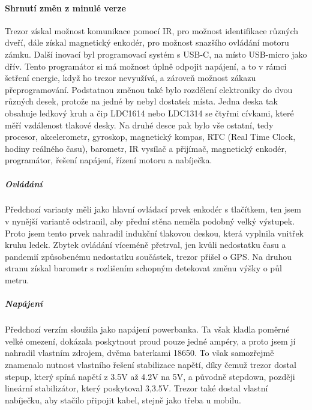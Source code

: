 \paragraph{Shrnutí změn z minulé verze}
Trezor získal možnost komunikace pomocí IR, pro možnost identifikace různých dveří, dále získal magnetický enkodér, pro možnost snazšího ovládání
motoru zámku. 
Další inovací byl programovací systém s USB-C, na místo USB-micro jako dřív. Tento programátor si má možnost úplně odpojit napájení, a to v rámci šetření 
energie, když ho trezor nevyužívá, a zároveň možnost zákazu přeprogramování.
Podstatnou změnou také bylo rozdělení elektroniky do dvou různých desek, protože na jedné by nebyl dostatek místa. Jedna deska tak obsahuje ledkový 
kruh a čip LDC1614 nebo LDC1314 se čtyřmi cívkami, které měří vzdálenost tlakové desky. Na druhé desce pak bylo vše ostatní, tedy procesor, akcelerometr,
gyroskop, magnetický kompas, RTC (Real Time Clock, hodiny reálného času), barometr, IR vysílač a přijímač, magnetický enkodér, programátor, řešení 
napájení, řízení motoru a nabíječka.

\subparagraph{Ovládání}
Předchozí varianty měli jako hlavní ovládací prvek enkodér s tlačítkem, ten jsem v nynější variantě odstranil, aby přední stěna neměla podobný velký 
výstupek. Proto jsem tento prvek nahradil indukční tlakovou deskou, která vyplnila vnitřek kruhu ledek. 
Zbytek ovládání víceméně přetrval, jen kvůli nedostatku času a pandemií způsobenému nedostatku součástek, trezor přišel o GPS. Na druhou stranu 
získal barometr s rozlišením schopným detekovat změnu výšky o půl metru.

\subparagraph{Napájení}
Předchozí verzím sloužila jako napájení powerbanka. Ta však kladla poměrné velké omezení, dokázala poskytnout proud pouze jedné ampéry, a proto 
jsem jí nahradil vlastním zdrojem, dvěma baterkami 18650. To však samozřejmě znamenalo nutnost vlastního řešení stabilizace napětí, díky čemuž 
trezor dostal stepup, který spíná napětí z 3.5V až 4.2V na 5V, a původně stepdown, později lineární stabilizátor, který poskytoval 3,3.5V.
Trezor také dostal vlastní nabíječku, aby stačilo připojit kabel, stejně jako třeba u mobilu.

\newpage